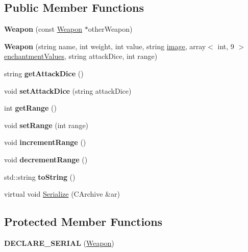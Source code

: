 \subsection*{Public Member Functions}
\begin{DoxyCompactItemize}
\item 
\hypertarget{class_weapon_ad948f8cbd8110949240e46c7c72c9556}{}\label{class_weapon_ad948f8cbd8110949240e46c7c72c9556} 
{\bfseries Weapon} (const \hyperlink{class_weapon}{Weapon} $\ast$other\+Weapon)
\item 
\hypertarget{class_weapon_a0fc6a57eb8c887a7e4a9d72dea29755c}{}\label{class_weapon_a0fc6a57eb8c887a7e4a9d72dea29755c} 
{\bfseries Weapon} (string name, int weight, int value, string \hyperlink{class_item_add84a42b692ee5d580a92ae4a922f784}{image}, array$<$ int, 9 $>$ \hyperlink{class_item_a8532d8729f9433f41b7fc18b20d83236}{enchantment\+Values}, string attack\+Dice, int range)
\item 
\hypertarget{class_weapon_ab3452fb4487ff88c46a4586cde0260cb}{}\label{class_weapon_ab3452fb4487ff88c46a4586cde0260cb} 
string {\bfseries get\+Attack\+Dice} ()
\item 
\hypertarget{class_weapon_a17ae76ac029507219ba18f6940b08258}{}\label{class_weapon_a17ae76ac029507219ba18f6940b08258} 
void {\bfseries set\+Attack\+Dice} (string attack\+Dice)
\item 
\hypertarget{class_weapon_af0d86939f16add54fc7ae87fea85ac21}{}\label{class_weapon_af0d86939f16add54fc7ae87fea85ac21} 
int {\bfseries get\+Range} ()
\item 
\hypertarget{class_weapon_a9227da33ba03135c9df353a91a7b0013}{}\label{class_weapon_a9227da33ba03135c9df353a91a7b0013} 
void {\bfseries set\+Range} (int range)
\item 
\hypertarget{class_weapon_a7dd6eff2cc572adb9bef4b985a255920}{}\label{class_weapon_a7dd6eff2cc572adb9bef4b985a255920} 
void {\bfseries increment\+Range} ()
\item 
\hypertarget{class_weapon_a6e28001720b8f43ee74f0ac7d3008ba5}{}\label{class_weapon_a6e28001720b8f43ee74f0ac7d3008ba5} 
void {\bfseries decrement\+Range} ()
\item 
\hypertarget{class_weapon_af1e10f75793cadcaec54a2ff96879312}{}\label{class_weapon_af1e10f75793cadcaec54a2ff96879312} 
std\+::string {\bfseries to\+String} ()
\item 
virtual void \hyperlink{class_weapon_a1c30e8f2add0a1aa8558cfbff13ad728}{Serialize} (C\+Archive \&ar)
\end{DoxyCompactItemize}
\subsection*{Protected Member Functions}
\begin{DoxyCompactItemize}
\item 
\hypertarget{class_weapon_acccf5cf3803e3ab7f63490e0d49c9abe}{}\label{class_weapon_acccf5cf3803e3ab7f63490e0d49c9abe} 
{\bfseries D\+E\+C\+L\+A\+R\+E\+\_\+\+S\+E\+R\+I\+AL} (\hyperlink{class_weapon}{Weapon})
\end{DoxyCompactItemize}
